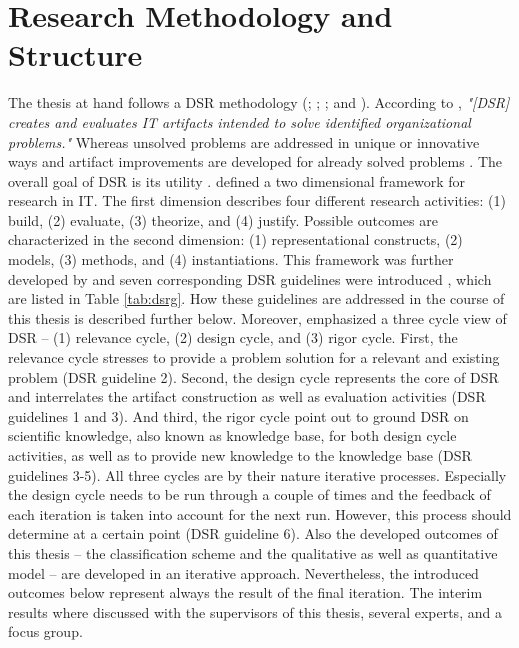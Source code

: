 \section{Research Methodology and Structure}\label{ch:intro:met}

The thesis at hand follows a \ac{DSR} methodology (\citealp{March1995}; \citealp{Hevner2004}; \citealp{Hevner2007}; and \citealp{Peffers2007}). According to \citet[p. 77]{Hevner2004}, \textit{"[\ac{DSR}] creates and evaluates IT artifacts intended to solve identified organizational problems."} Whereas unsolved problems are addressed in unique or innovative ways and artifact improvements are developed for already solved problems \citep[p. 81]{Hevner2004}. The overall goal of \ac{DSR} is its utility \citep[p. 80]{Hevner2004}.
\citet[pp. 255-262]{March1995} defined a two dimensional framework for research in \ac{IT}. The first dimension describes four different research activities: (1) build, (2) evaluate, (3) theorize, and (4) justify. Possible outcomes are characterized in the second dimension: (1) representational constructs, (2) models, (3) methods, and (4) instantiations. This framework was further developed by \citet[pp. 78-81]{Hevner2004} and seven corresponding \ac{DSR} guidelines were introduced \citep[pp. 82-90]{Hevner2004}, which are listed in Table \ref{tab:dsrg}. How these guidelines are addressed in the course of this thesis is described further below. Moreover, \citet[pp. 87-92]{Hevner2007} emphasized a three cycle view of \ac{DSR} -- (1) relevance cycle, (2) design cycle, and (3) rigor cycle. First, the relevance cycle stresses to provide a problem solution for a relevant and existing problem (\ac{DSR} guideline 2). Second, the design cycle represents the core of \ac{DSR} and interrelates the artifact construction as well as evaluation activities (\ac{DSR} guidelines 1 and 3). And third, the rigor cycle point out to ground \ac{DSR} on scientific knowledge, also known as knowledge base, for both design cycle activities, as well as to provide new knowledge to the knowledge base (\ac{DSR} guidelines 3-5). All three cycles are by their nature iterative processes. Especially the design cycle needs to be run through a couple of times and the feedback of each iteration is taken into account for the next run. However, this process should determine at a certain point (\ac{DSR} guideline 6). Also the developed outcomes of this thesis -- the classification scheme and the qualitative as well as quantitative model -- are developed in an iterative approach. Nevertheless, the introduced outcomes below represent always the result of the final iteration. The interim results where discussed with the supervisors of this thesis, several experts, and a focus group.

